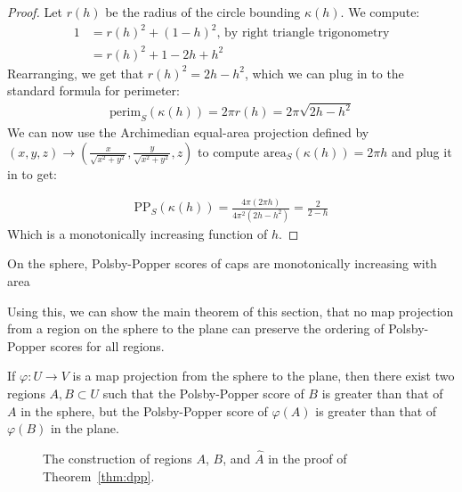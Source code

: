 \begin{proof}
  Let $r(h)$ be the radius of the circle bounding $\kappa(h)$. We
  compute: 
  \begin{align*}
    1 &= r(h)^2 + (1-h)^2 \text {, by right triangle trigonometry}\\ 
      &= r(h)^2 + 1 - 2h+h^2
  \end{align*}
  Rearranging, we get that $r(h)^2= 2h-h^2$, which we can plug in to
  the standard formula for perimeter:
  \begin{align*}
    \mathrm{perim}_S(\kappa(h)) = 2\pi r(h) = 2\pi \sqrt{2h-h^2}
  \end{align*}
  We can now use the Archimedian equal-area projection 
  defined by $(x,y,z) \to
  \left(\frac{x}{\sqrt{x^2+y^2}},\frac{y}{\sqrt{x^2+y^2}}, z\right)$ 
  to compute $\mathrm{area}_S(\kappa(h)) = 2\pi h$ and plug it in to 
  get:

  \begin{align*}
    \mathrm{PP}_S(\kappa(h)) = \frac{4\pi (2\pi h) }{4 \pi^2 (2h-h^2)}
    = \frac{2}{2-h}
  \end{align*}
  Which is a monotonically increasing function of $h$.
\end{proof}
\begin{corollary}\label{cor:capscale}
  On the sphere, Polsby-Popper scores of caps are monotonically
  increasing with area
\end{corollary}
Using this, we can show the main theorem of this section, that no map
projection from a region on the sphere to the plane can preserve the ordering
of Polsby-Popper scores for all regions.  

\begin{theorem}\label{thm:dpp}
  If $\varphi:U\to V$ is a map projection from the sphere to the plane,
  then there exist two regions $A,B\subset U$ such that
  the Polsby-Popper score of $B$ is greater than that of $A$ in the
  sphere, but the Polsby-Popper score of $\varphi(A)$ is greater than
  that of $\varphi(B)$ in the plane.
\end{theorem}
\begin{figure}[h]
  \centering

  \caption{The construction of regions $A$, $B$, and $\hat{A}$ in the
  proof of Theorem~\ref{thm:dpp}.} 
\label{fig:dpp}
\end{figure}


